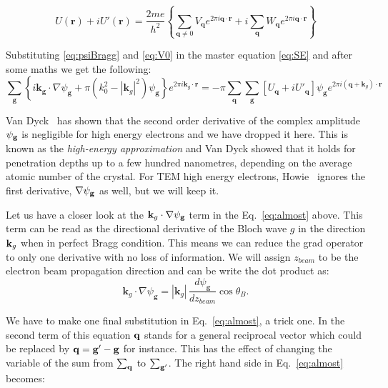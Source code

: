\begin{equation*}
U(\mathbf{r}) + iU'(\mathbf{r}) = \frac{2me}{h^2}\left\{ \sum_{\mathbf{q}\neq 0} V_{\mathbf{q}} e^{2 \pi i \mathbf{q} \cdot \mathbf{r}} + i \sum_{\mathbf{q}} W_{\mathbf{q}} e^{2 \pi i \mathbf{q} \cdot \mathbf{r}}\right\}
\end{equation*}



Substituting \ref{eq:psiBragg} and \ref{eq:V0} in the master equation \ref{eq:SE} and after some maths we get the following:
\begin{equation*}
\label{eq:almost}
\sum_\mathbf{g}\left\{ i \mathbf{k_g} \cdot \nabla \psi_\mathbf{g}  + \pi \left(k_0^2 - |\mathbf{k}_g|^2\right) \psi_\mathbf{g} \right\} e^{2\pi i\mathbf{k}_g \cdot \mathbf{r}} =
-\pi \sum_\mathbf{q}\sum_\mathbf{g} [U_\mathbf{q} + iU'_\mathbf{q}]\psi_\mathbf{g} e^{2\pi i(\mathbf{q}+\mathbf{k}_g)\cdot \mathbf{r}} 
\end{equation*}

Van Dyck~\cite{VanDyck76} has shown that the second order derivative of the complex amplitude $\psi_{\vb{g}}$ is negligible for high energy electrons and we have dropped it here. This is known as the \textit{high-energy approximation} and Van Dyck showed that it holds for penetration depths up to a few hundred nanometres, depending on the average atomic number of the crystal. For TEM high energy electrons, Howie~\cite{Howie61} ignores the first derivative, $\nabla \psi_{\vb{g}}$ as well, but we will keep it.

Let us have a closer look at the $\vb{k}_g \cdot  \nabla \psi_\mathbf{g} $ term in the Eq.~\ref{eq:almost} above. This term can be read as the directional derivative of the Bloch wave $g$ in the direction $\vb{k}_g$ when in perfect Bragg condition. This means we can reduce the grad operator to only one derivative with no loss of information.  We will assign $z_{beam}$ to be the electron beam propagation direction and can be write the dot product as:
\begin{equation*}
\mathbf{k}_g \cdot \nabla \psi_\mathbf{g} = \left| \mathbf{k}_g \right| \, \frac{d \psi_\mathbf{g}}{dz_{beam}} \cos{\theta_B}.
\end{equation*}



We have to make one final substitution in Eq.~\ref{eq:almost}, a trick one. In the second term of this equation $\vb{q}$ stands for a general reciprocal vector which could be replaced by $\vb{q} = \vb{g'}-\vb{g}$ for instance. This has the effect of changing the variable of the sum from $\sum_{\vb{q}}$ to $\sum_{\vb{g'}}$. The right hand side in Eq.~\ref{eq:almost} becomes:

